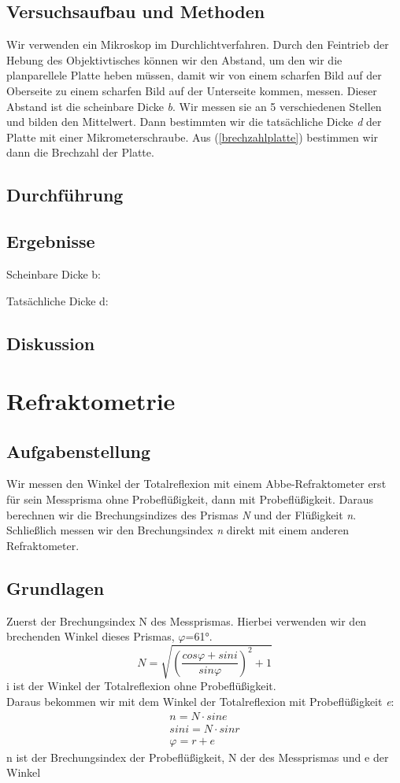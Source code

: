 \documentclass{article}
\begin{document}
\subsection{Versuchsaufbau und Methoden}
Wir verwenden ein Mikroskop im Durchlichtverfahren. Durch den Feintrieb der Hebung des Objektivtisches können wir den Abstand, um den wir die planparellele Platte heben müssen, damit wir von einem scharfen Bild auf der Oberseite zu einem scharfen Bild auf der Unterseite kommen, messen. Dieser Abstand ist die scheinbare Dicke \textit{b}. Wir messen sie an 5 verschiedenen Stellen und bilden den Mittelwert. Dann bestimmten wir die tatsächliche Dicke \textit{d} der Platte mit einer Mikrometerschraube. Aus (\ref{brechzahlplatte}) bestimmen wir dann die Brechzahl der Platte.
\subsection{Durchführung}
\subsection{Ergebnisse}
Scheinbare Dicke b:

Tatsächliche Dicke d:


\subsection{Diskussion}

\section{Refraktometrie}

\subsection{Aufgabenstellung}
Wir messen den Winkel der Totalreflexion mit einem Abbe-Refraktometer erst für sein Messprisma ohne Probeflüßigkeit, dann mit Probeflüßigkeit. Daraus berechnen wir die Brechungsindizes des Prismas \textit{N} und der Flüßigkeit \textit{n}. Schließlich messen wir den Brechungsindex \textit{n} direkt mit einem anderen Refraktometer. 
\subsection{Grundlagen}
Zuerst der Brechungsindex N des Messprismas. Hierbei verwenden wir den brechenden Winkel dieses Prismas, $\varphi$=61°.
\begin{equation}
\label{NMessprisma}
N=\sqrt{(\frac{cos\varphi + sin i}{sin \varphi})^2+1}
\end{equation}
i ist der Winkel der Totalreflexion ohne Probeflüßigkeit. \\
Daraus bekommen wir mit dem Winkel der Totalreflexion mit Probeflüßigkeit \textit{e}:
\begin{align}
n=N \cdot sin e \\
sin i= N \cdot sin r \\
\varphi = r + e
\end{align}
n ist der Brechungsindex der Probeflüßigkeit, N der des Messprismas und e der Winkel 
\end{document}
